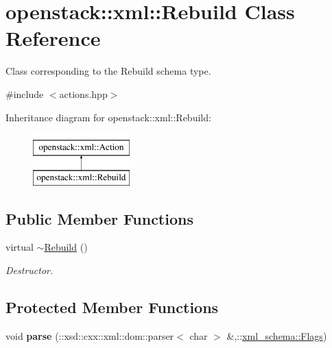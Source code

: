 \hypertarget{classopenstack_1_1xml_1_1Rebuild}{
\section{openstack::xml::Rebuild Class Reference}
\label{classopenstack_1_1xml_1_1Rebuild}
}


Class corresponding to the Rebuild schema type.  




{\ttfamily \#include $<$actions.hpp$>$}

Inheritance diagram for openstack::xml::Rebuild:\begin{figure}[H]
\begin{center}
\leavevmode
\includegraphics[height=2.000000cm]{classopenstack_1_1xml_1_1Rebuild}
\end{center}
\end{figure}
\subsection*{Public Member Functions}
\begin{DoxyCompactItemize}
\item 
\hypertarget{classopenstack_1_1xml_1_1Rebuild_af9876ec5e9ba4599f31353c9a1b6ab14}{
virtual \hyperlink{classopenstack_1_1xml_1_1Rebuild_af9876ec5e9ba4599f31353c9a1b6ab14}{$\sim$Rebuild} ()}
\label{classopenstack_1_1xml_1_1Rebuild_af9876ec5e9ba4599f31353c9a1b6ab14}

\begin{DoxyCompactList}\small\item\em Destructor. \item\end{DoxyCompactList}\end{DoxyCompactItemize}
\subsection*{Protected Member Functions}
\begin{DoxyCompactItemize}
\item 
\hypertarget{classopenstack_1_1xml_1_1Rebuild_a59efe2d547098b66129b8f528e29dc1f}{
void {\bfseries parse} (::xsd::cxx::xml::dom::parser$<$ char $>$ \&,::\hyperlink{namespacexml__schema_affb4c227cbd9aa7453dd1dc5a1401943}{xml\_\-schema::Flags})}
\label{classopenstack_1_1xml_1_1Rebuild_a59efe2d547098b66129b8f528e29dc1f}

\end{DoxyCompactItemize}
